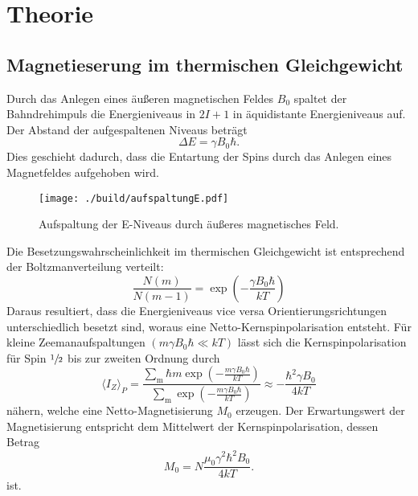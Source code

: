 \section{Theorie}%
\label{sec:theorie}
\subsection{Magnetieserung im thermischen Gleichgewicht}%
\label{ssub:magnetieserung_im_thermischen_gleichgewicht}
Durch das Anlegen eines äußeren magnetischen Feldes $B_0$ spaltet der Bahndrehimpuls die Energieniveaus in $2 I
+ 1$ in äquidistante Energieniveaus auf. 
Der Abstand der aufgespaltenen Niveaus beträgt 
\begin{equation}
		\label{eq:delta_e}
		\Delta E = \gamma B_0 \hbar. 
\end{equation}
Dies geschieht dadurch, dass die Entartung der Spins durch das Anlegen eines
Magnetfeldes aufgehoben wird.
\begin{figure}[ht]
		\centering
		\texttt{[image: ./build/aufspaltungE.pdf]}
		\caption{Aufspaltung der E-Niveaus durch äußeres magnetisches Feld.}
		\label{fig:aufsp_E}
\end{figure}
Die Besetzungswahrscheinlichkeit im thermischen Gleichgewicht ist entsprechend
der Boltzmanverteilung verteilt:
\begin{equation}
		\label{eq:boltzmann}
		\frac{N(m)}{N(m-1)} = \exp \left( - \frac{\gamma B_0 \hbar}{kT} \right)
\end{equation}
Daraus resultiert, dass die Energieniveaus vice versa Orientierungsrichtungen unterschiedlich
besetzt sind, woraus eine Netto-Kernspinpolarisation entsteht. 
Für kleine Zeemanaufspaltungen $(m \gamma B_0 \hbar \ll kT)$ lässt sich die
Kernspinpolarisation für Spin $\sfrac{1}{2}$ bis zur
zweiten Ordnung durch
\begin{equation}
		\label{eq:kernpo}
		\langle I_Z \rangle_P = \frac{\sum_\text{m} \hbar m \exp\left(-\frac{m \gamma B_0
		\hbar}{kT}\right)}{\sum_\text{m}\exp\left(-\frac{m \gamma B_0
		\hbar}{kT}\right)} \approx - \frac{\hbar^2 \gamma B_0}{4 kT}
\end{equation}
nähern, welche eine Netto-Magnetisierung $M_0$ erzeugen. 
Der Erwartungswert der Magnetisierung entspricht dem Mittelwert der
Kernspinpolarisation, dessen Betrag 
\begin{equation}
		\label{eq:magn}
		M_0 = N \frac{\mu_0 \gamma^2 \hbar^2 B_0}{4 kT} .
\end{equation}
ist.

